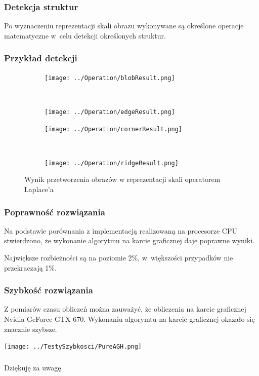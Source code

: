 \begin{frame}
\frametitle{Detekcja struktur}

Po wyznaczeniu reprezentacji skali obrazu wykonywane są określone operacje matematyczne w~celu detekcji określonych struktur.


\end{frame}
\begin{frame}
\frametitle{Przykład detekcji}

\begin{figure}[h]
\begin{center}
\begin{subfigure}[b]{2cm}
\centering
\texttt{[image: ../Operation/blobResult.png]}
\end{subfigure}~
\begin{subfigure}[b]{2cm}
\centering
\texttt{[image: ../Operation/edgeResult.png]}
\end{subfigure}

\begin{subfigure}[b]{2cm}
\centering
\texttt{[image: ../Operation/cornerResult.png]}
\end{subfigure}~
\begin{subfigure}[b]{2cm}
\centering
\texttt{[image: ../Operation/ridgeResult.png]}
\end{subfigure}
\caption{Wynik przetworzenia obrazów w reprezentacji skali operatorem Laplace'a}
\label{fig:wynik}
\end{center}
\end{figure}

\end{frame}
\begin{frame}
\frametitle{Poprawność rozwiązania}

Na podstawie porównania z implementacją realizowaną na procesorze CPU stwierdzono, że wykonanie algorytmu na karcie graficznej daje poprawne wyniki.

Największe rozbieżności są na poziomie 2\%, w~większości przypadków nie przekraczają 1\%.


\end{frame}
\begin{frame}
\frametitle{Szybkość rozwiązania}

Z pomiarów czasu obliczeń można zauważyć, że obliczenia na karcie graficznej Nvidia GeForce GTX 670.
Wykonaniu algorymtu na karcie graficznej okazało się znacznie szybsze.
\begin{center}
\texttt{[image: ../TestySzybkosci/PureAGH.png]}

\end{center}



\end{frame}

\begin{frame}
\frametitle{}
\begin{center}
Dziękuję za uwagę.
\end{center}
\end{frame}
